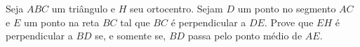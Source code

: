 Seja $ABC$ um triângulo e $H$ seu ortocentro. Sejam $D$ um ponto no segmento $AC$ e $E$ um ponto na reta $BC$ tal que $BC$ é perpendicular a $DE$. Prove que $EH$ é perpendicular a $BD$ se, e somente se, $BD$ passa pelo ponto médio de $AE$.
